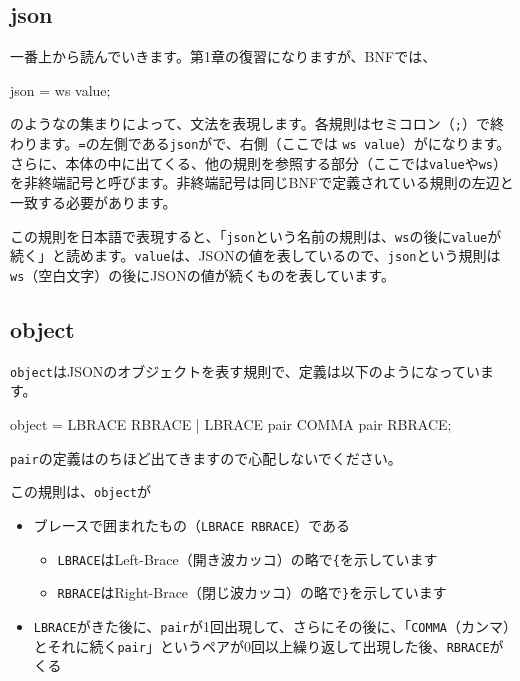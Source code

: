 \subsection{json}

一番上から読んでいきます。第1章の復習になりますが、BNFでは、

\begin{codescreen}{}
json = ws value;
\end{codescreen}

\noindent のようなの集まりによって、文法を表現します。各規則はセミコロン（\texttt{;}）で終わります。\texttt{=}の左側である\texttt{json}がで、右側（ここでは
\texttt{ws\ value}）がになります。さらに、本体の中に出てくる、他の規則を参照する部分（ここでは\texttt{value}や\texttt{ws}）を非終端記号と呼びます。非終端記号は同じBNFで定義されている規則の左辺と一致する必要があります。

この規則を日本語で表現すると、「\texttt{json}という名前の規則は、\texttt{ws}の後に\texttt{value}が続く」と読めます。\texttt{value}は、JSONの値を表しているので、\texttt{json}という規則は\texttt{ws}（空白文字）の後にJSONの値が続くものを表しています。

\subsection{object}

\texttt{object}はJSONのオブジェクトを表す規則で、定義は以下のようになっています。

\begin{codescreen}{}
object = LBRACE RBRACE | LBRACE pair {COMMA pair} RBRACE;
\end{codescreen}

\texttt{pair}の定義はのちほど出てきますので心配しないでください。

この規則は、\texttt{object}が

\begin{itemize}
\item
  ブレースで囲まれたもの（\texttt{LBRACE\ RBRACE}）である

  \begin{itemize}
  \item
    \texttt{LBRACE}はLeft-Brace（開き波カッコ）の略で\texttt{\{}を示しています
  \item
    \texttt{RBRACE}はRight-Brace（閉じ波カッコ）の略で\texttt{\}}を示しています
  \end{itemize}
\item
  \texttt{LBRACE}がきた後に、\texttt{pair}が1回出現して、さらにその後に、「\texttt{COMMA}（カンマ）とそれに続く\texttt{pair}」というペアが0回以上繰り返して出現した後、\texttt{RBRACE}がくる
\end{itemize}


